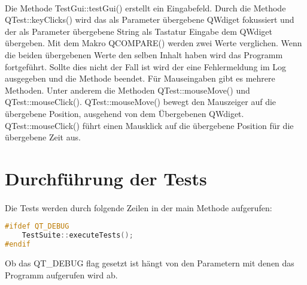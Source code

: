 		\paragraph{} Die Methode TestGui::testGui() erstellt ein Eingabefeld. Durch die Methode QTest::keyClicks() wird das als Parameter übergebene QWdiget fokussiert und der als Parameter übergebene String als Tastatur Eingabe dem QWdiget übergeben. Mit dem Makro QCOMPARE() werden zwei Werte verglichen. Wenn die beiden übergebenen Werte den selben Inhalt haben wird das Programm fortgeführt. Sollte dies nicht der Fall ist wird der eine Fehlermeldung im Log ausgegeben und die Methode beendet. Für Mauseingaben gibt es mehrere Methoden. Unter anderem die Methoden QTest::mouseMove() und QTest::mouseClick(). QTest::mouseMove() bewegt den Mauszeiger auf die übergebene Position, ausgehend von dem Übergebenen QWdiget. QTest::mouseClick() führt einen Mausklick auf die übergebene Position für die übergebene Zeit aus.
		
		\newpage
		
		\section{Durchführung der Tests}
		\paragraph{} Die Tests werden durch folgende Zeilen in der main Methode aufgerufen:
		\begin{lstlisting}[language=C++, caption=main.cpp]
#ifdef QT_DEBUG
    TestSuite::executeTests();
#endif
		\end{lstlisting}
		Ob das QT\_DEBUG flag gesetzt ist hängt von den Parametern mit denen das Programm aufgerufen wird ab.
		
